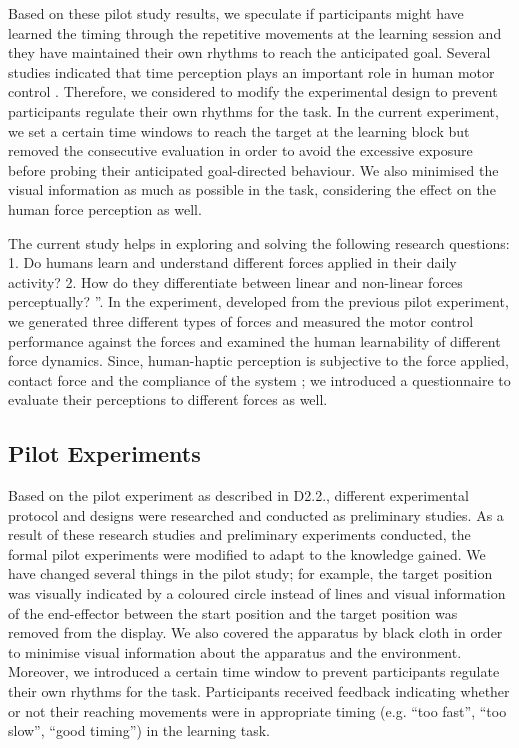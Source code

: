 Based on these pilot study results, we speculate if participants might have learned the timing through the repetitive movements at the learning session and they have maintained their own rhythms to reach the anticipated goal. Several studies indicated that time perception plays an important role in human motor control \cite{Berret2016, Goodbody1998, Rank2015}. Therefore, we considered to modify the experimental design to prevent participants regulate their own rhythms for the task. In the current experiment, we set a certain time windows to reach the target at the learning block but removed the consecutive evaluation in order to avoid the excessive exposure before probing their anticipated goal-directed behaviour. We also minimised the visual information as much as possible in the task, considering the effect on the human force perception as well.

The current study helps in exploring and solving the following research questions: 1. Do humans learn and understand different forces applied in their daily activity? 2. How do they differentiate between linear and non-linear forces perceptually? ”. In the experiment, developed from the previous pilot experiment, we generated three different types of forces and measured the motor control performance against the forces and examined the human learnability of different force dynamics. Since, human-haptic perception is subjective to the force applied, contact force and the compliance of the system \cite{van2014}; we introduced a questionnaire to evaluate their perceptions to different forces as well. 

\subsection{Pilot Experiments}
Based on the pilot experiment as described in D2.2., different experimental protocol and designs were researched and conducted as preliminary studies. As a result of these research studies and preliminary experiments conducted, the formal pilot experiments were modified to adapt to the knowledge gained. We have changed several things in the pilot study; for example, the target position was visually indicated by a coloured circle instead of lines and visual information of the end-effector between the start position and the target position was removed from the display. We also covered the apparatus by black cloth in order to minimise visual information about the apparatus and the environment. Moreover, we introduced a certain time window to prevent participants regulate their own rhythms for the task. Participants received feedback indicating whether or not their reaching movements were in appropriate timing (e.g. “too fast”, “too slow”, “good timing”) in the learning task.

